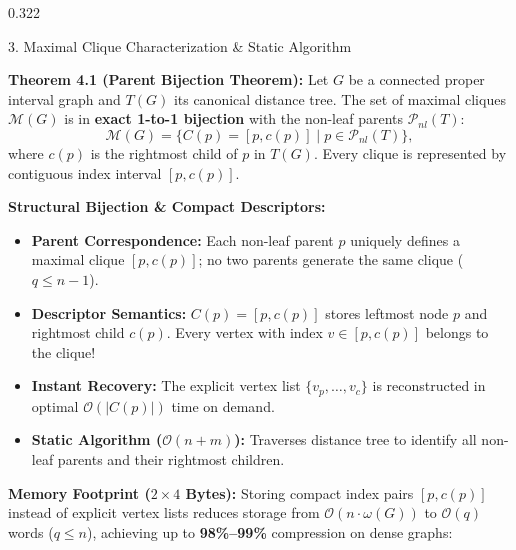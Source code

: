 \documentclass[final,17pt]{beamer}
\begin{document}
\begin{frame}[t]
\begin{columns}[t]
\begin{column}{0.322\textwidth}
    \begin{posterbox}{3. Maximal Clique Characterization \& Static Algorithm}

        \begin{highlightbox}
            \textbf{Theorem 4.1 (Parent Bijection Theorem):}
            Let $G$ be a connected proper interval graph and $T(G)$ its canonical distance tree. The set of maximal cliques $\mathcal{M}(G)$ is in \textbf{exact 1-to-1 bijection} with the non-leaf parents $\mathcal{P}_{nl}(T)$:
            \begin{equation*}
                \mathcal{M}(G) = \{ C(p) = [p, c(p)] \mid p \in \mathcal{P}_{nl}(T) \},
            \end{equation*}
            where $c(p)$ is the rightmost child of $p$ in $T(G)$. Every clique is represented by contiguous index interval $[p, c(p)]$.
        \end{highlightbox}

        \textbf{Structural Bijection \& Compact Descriptors:}
        \begin{itemize}\setlength{\itemsep}{0.6pt}
            \scriptsize
            \item \textbf{Parent Correspondence:} Each non-leaf parent $p$ uniquely defines a maximal clique $[p, c(p)]$; no two parents generate the same clique ($q \le n-1$).
            \item \textbf{Descriptor Semantics:} $C(p) = [p, c(p)]$ stores leftmost node $p$ and rightmost child $c(p)$. Every vertex with index $v \in [p, c(p)]$ belongs to the clique!
            \item \textbf{Instant Recovery:} The explicit vertex list $\{v_p, \dots, v_c\}$ is reconstructed in optimal $\mathcal{O}(|C(p)|)$ time on demand.
            \item \textbf{Static Algorithm ($\mathcal{O}(n+m)$):} Traverses distance tree to identify all non-leaf parents and their rightmost children.
        \end{itemize}

        \vspace{1pt}
        \textbf{Memory Footprint ($2 \times 4$ Bytes):}
        Storing compact index pairs $[p, c(p)]$ instead of explicit vertex lists reduces storage from $\mathcal{O}(n \cdot \omega(G))$ to $\mathcal{O}(q)$ words ($q \le n$), achieving up to \textbf{98\%--99\%} compression on dense graphs:
        \vspace{2pt}


\end{posterbox}
\end{column}
\end{columns}
\end{frame}
\end{document}
